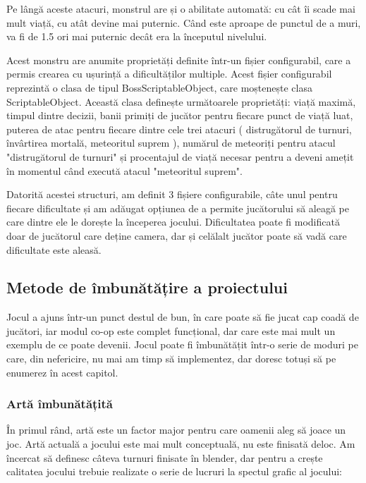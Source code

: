 \documentclass[12pt, a4paper]{article}
\begin{document}
	Pe lângă aceste atacuri, monstrul are și o abilitate automată: cu cât îi scade mai mult viață, cu atât devine mai puternic. Când este aproape de punctul de a muri, va fi de 1.5 ori mai puternic decât era la începutul nivelului.
	\newline
	
	Acest monstru are anumite proprietăți definite într-un fișier configurabil, care a permis crearea cu ușurință a dificultăților multiple. Acest fișier configurabil reprezintă o clasa de tipul BossScriptableObject, care moștenește clasa ScriptableObject. Această clasa definește următoarele proprietăți: viață maximă, timpul dintre decizii, banii primiți de jucător pentru fiecare punct de viață luat, puterea de atac pentru fiecare dintre cele trei atacuri ( distrugătorul de turnuri, învârtirea mortală, meteoritul suprem ), numărul de meteoriți pentru atacul "distrugătorul de turnuri" și procentajul de viață necesar pentru a deveni amețit în momentul când execută atacul "meteoritul suprem".
	\newline
	
	Datorită acestei structuri, am definit 3 fișiere configurabile, câte unul pentru fiecare dificultate și am adăugat opțiunea de a permite jucătorului să aleagă pe care dintre ele le dorește la începerea jocului. Dificultatea poate fi modificată doar de jucătorul care deține camera, dar și celălalt jucător poate să vadă care dificultate este aleasă.
	
	
	
	
	
	\subsection{Metode de îmbunătățire a proiectului}
	
	Jocul a ajuns într-un punct destul de bun, în care poate să fie jucat cap coadă de jucători, iar modul co-op este complet funcțional, dar care este mai mult un exemplu de ce poate devenii. Jocul poate fi îmbunătățit într-o serie de moduri pe care, din nefericire, nu mai am timp să implementez, dar doresc totuși să pe enumerez în acest capitol.
	
	
	
	
	
	\subsubsection{Artă îmbunătățită}
	
	În primul rând, artă este un factor major pentru care oamenii aleg să joace un joc. Artă actuală a jocului este mai mult conceptuală, nu este finisată deloc. Am încercat să definesc câteva turnuri finisate în blender, dar pentru a crește calitatea jocului trebuie realizate o serie de lucruri la spectul grafic al jocului:
	
\end{document}
